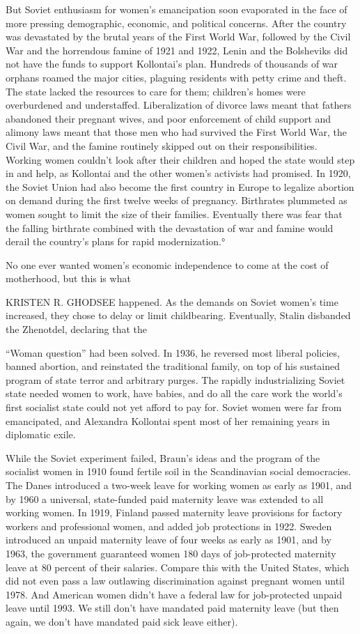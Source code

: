 But Soviet enthusiasm for women’s emancipation soon evaporated in the face of more pressing demographic, economic, and political concerns. After the country was devastated by the brutal years of the First World War, followed by the Civil War and the horrendous famine of 1921 and 1922, Lenin and the Bolsheviks did not have the funds to support Kollontai’s plan. Hundreds of thousands of war orphans roamed the major cities, plaguing residents with petty crime and theft. The state lacked the resources to care for them; children’s homes were overburdened and understaffed. Liberalization of divorce laws meant that fathers abandoned their pregnant wives, and poor enforcement of child support and alimony laws meant that those men who had survived the First World War, the Civil War, and the famine routinely skipped out on their responsibilities. Working women couldn’t look after their children and hoped the state would step in and help, as Kollontai and the other women’s activists had promised. In 1920, the Soviet Union had also become the first country in Europe to legalize abortion on demand during the first twelve weeks of pregnancy. Birthrates plummeted as women sought to limit the size of their families. Eventually there was fear that the falling birthrate combined with the devastation of war and famine would derail the country’s plans for rapid modernization.°
 \par 
No one ever wanted women’s economic independence to come at the cost of motherhood, but this is what
 \par 
KRISTEN R. GHODSEE happened. As the demands on Soviet women’s time increased, they chose to delay or limit childbearing. Eventually, Stalin disbanded the Zhenotdel, declaring that the
 \par 
“Woman question” had been solved. In 1936, he reversed most liberal policies, banned abortion, and reinstated the traditional family, on top of his sustained program of state terror and arbitrary purges. The rapidly industrializing Soviet state needed women to work, have babies, and do all the care work the world’s first socialist state could not yet afford to pay for. Soviet women were far from emancipated, and Alexandra Kollontai spent most of her remaining years in diplomatic exile.
 \par 
While the Soviet experiment failed, Braun’s ideas and the program of the socialist women in 1910 found fertile soil in the Scandinavian social democracies. The Danes introduced a two-week leave for working women as early as 1901, and by 1960 a universal, state-funded paid maternity leave was extended to all working women. In 1919, Finland passed maternity leave provisions for factory workers and professional women, and added job protections in 1922. Sweden introduced an unpaid maternity leave of four weeks as early as 1901, and by 1963, the government guaranteed women {\color{blue}180} days of job-protected maternity leave at {\color{blue}80} percent of their salaries. Compare this with the United States, which did not even pass a law outlawing discrimination against pregnant women until 1978. And American women didn’t have a federal law for job-protected unpaid leave until 1993. We still don’t have mandated paid maternity leave (but then again, we don’t have mandated paid sick leave either).
